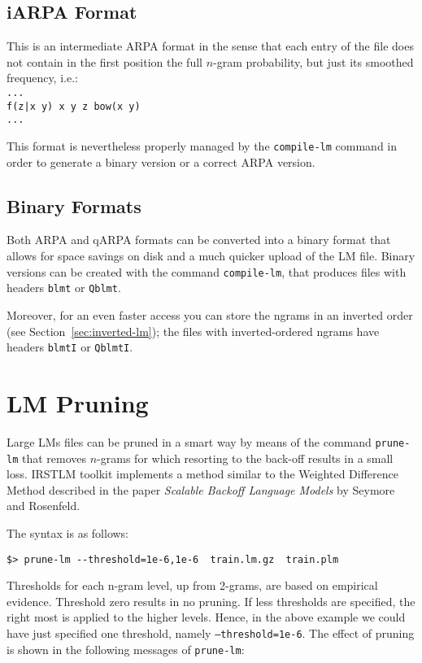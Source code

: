 \documentclass[11pt]{article}
\begin{document}
\subsection{iARPA Format}
This is an intermediate ARPA format in the sense that each entry of the file
does not contain in the first position the full $n$-gram probability, but just its
smoothed frequency, i.e.:\\
\noindent
{\tt ...\\
f(z|x y) x y z bow(x y)\\
...
}

\noindent
This format is nevertheless properly managed by the {\tt compile-lm} command
in order to generate a binary version or a correct ARPA version.


\subsection{Binary Formats}
Both ARPA and qARPA formats can be converted into a binary format 
that allows for space savings on disk and a much quicker upload of
the LM file.  Binary versions can be created with the command 
{\tt compile-lm}, that produces files with  headers {\tt blmt} or {\tt Qblmt}.

\noindent
Moreover, for an even faster access you can store the ngrams in an inverted
order (see Section~\ref{sec:inverted-lm});
the files with inverted-ordered ngrams have headers  {\tt blmtI} or {\tt QblmtI}.

\newpage
\section{LM Pruning}
Large LMs files can be pruned in a smart way by means of the command 
{\tt prune-lm} that removes $n$-grams for which resorting to the back-off 
results in a small loss. IRSTLM toolkit implements a method similar to the 
Weighted Difference Method described in the paper {\em Scalable Backoff
Language Models} by Seymore and Rosenfeld.

\noindent
The syntax is as follows:
\begin{verbatim}
$> prune-lm --threshold=1e-6,1e-6  train.lm.gz  train.plm
\end{verbatim}
Thresholds for each n-gram level, up from 2-grams, are based on empirical 
evidence. Threshold zero results in no pruning. If less thresholds are specified,
the right most is applied to the higher levels. Hence, in the above example we
could have just specified one threshold, namely {\tt --threshold=1e-6}. 
The effect of pruning is shown in the following messages of {\tt prune-lm}:
\end{document}
